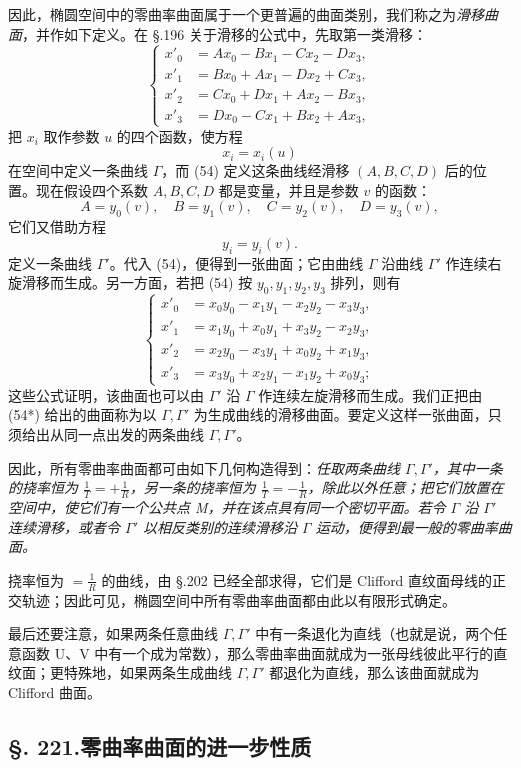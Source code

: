 因此，椭圆空间中的零曲率曲面属于一个更普遍的曲面类别，我们称之为\emph{滑移曲面}，并作如下定义。在 \S.196 关于滑移的公式中，先取第一类滑移：
\[
\tag{54}
\left\{
\begin{aligned}
x'_0&=Ax_0-Bx_1-Cx_2-Dx_3,\\
x'_1&=Bx_0+Ax_1-Dx_2+Cx_3,\\
x'_2&=Cx_0+Dx_1+Ax_2-Bx_3,\\
x'_3&=Dx_0-Cx_1+Bx_2+Ax_3,
\end{aligned}\right.
\]
把 $x_i$ 取作参数 $u$ 的四个函数，使方程
\[
x_i=x_i(u)
\]
在空间中定义一条曲线 $\Gamma$，而 (54) 定义这条曲线经滑移 $(A,B,C,D)$ 后的位置。现在假设四个系数 $A,B,C,D$ 都是变量，并且是参数 $v$ 的函数：
\[
A=y_0(v),\quad B=y_1(v),\quad C=y_2(v),\quad D=y_3(v),
\]
它们又借助方程
\[
y_i=y_i(v).
\]
定义一条曲线 $\Gamma'$。代入 (54)，便得到一张曲面；它由曲线 $\Gamma$ 沿曲线 $\Gamma'$ 作连续右旋滑移而生成。另一方面，若把 (54) 按 $y_0,y_1,y_2,y_3$ 排列，则有
\[
\tag{54*}
\left\{
\begin{aligned}
x'_0&=x_0y_0-x_1y_1-x_2y_2-x_3y_3,\\
x'_1&=x_1y_0+x_0y_1+x_3y_2-x_2y_3,\\
x'_2&=x_2y_0-x_3y_1+x_0y_2+x_1y_3,\\
x'_3&=x_3y_0+x_2y_1-x_1y_2+x_0y_3;
\end{aligned}\right.
\]
这些公式证明，该曲面也可以由 $\Gamma'$ 沿 $\Gamma$ 作连续左旋滑移而生成。我们正把由 (54*) 给出的曲面称为以 $\Gamma,\Gamma'$ 为生成曲线的滑移曲面。要定义这样一张曲面，只须给出从同一点出发的两条曲线 $\Gamma,\Gamma'$。

因此，所有零曲率曲面都可由如下几何构造得到：\emph{任取两条曲线 $\Gamma,\Gamma'$，其中一条的挠率恒为 $\frac1T=+\frac1R$，另一条的挠率恒为 $\frac1T=-\frac1R$，除此以外任意；把它们放置在空间中，使它们有一个公共点 M，并在该点具有同一个密切平面。若令 $\Gamma$ 沿 $\Gamma'$ 连续滑移，或者令 $\Gamma'$ 以相反类别的连续滑移沿 $\Gamma$ 运动，便得到最一般的零曲率曲面。}

挠率恒为 $=\frac1R$ 的曲线，由 \S.202 已经全部求得，它们是 Clifford 直纹面母线的正交轨迹；因此可见，椭圆空间中所有零曲率曲面都由此以有限形式确定。

最后还要注意，如果两条任意曲线 $\Gamma,\Gamma'$ 中有一条退化为直线（也就是说，两个任意函数 U、V 中有一个成为常数），那么零曲率曲面就成为一张母线彼此平行的直纹面；更特殊地，如果两条生成曲线 $\Gamma,\Gamma'$ 都退化为直线，那么该曲面就成为 Clifford 曲面。

\subsection*{\S. 221.\quad 零曲率曲面的进一步性质}

